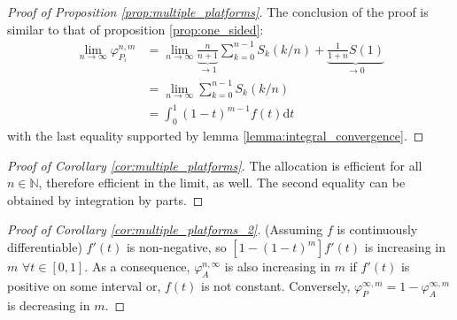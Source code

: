 \documentclass[a4paper]{article}
\newcommand{\dt}{\mathrm{d}t}
\begin{document}
\begin{proof}[Proof of Proposition \ref{prop:multiple_platforms}]
    The conclusion of the proof is similar to that of proposition \ref{prop:one_sided}:
    \begin{align*}
        \lim_{n \to \infty} \varphi_{P_i}^{n, m} &= \lim_{n \to \infty} \underbrace{\frac{n}{n+1}}_{\to 1} \sum_{k=0}^{n-1} S_k(k/n) + \underbrace{\frac{1}{1+n}S(1)}_{\to 0} \\
        &= \lim_{n \to \infty} \sum_{k=0}^{n-1} S_k(k/n) \\
        &= \int_0^1 (1-t)^{m-1} f(t) \dt
    \end{align*}
    with the last equality supported by lemma \ref{lemma:integral_convergence}.
\end{proof}

\begin{proof}[Proof of Corollary \ref{cor:multiple_platforms}]
    The allocation is efficient for all $n \in \mathbb{N}$, therefore efficient in the limit, as well.
    The second equality can be obtained by integration by parts.
\end{proof}

\begin{proof}[Proof of Corollary \ref{cor:multiple_platforms_2}] (Assuming $f$ is continuously differentiable) %
    $f'(t)$ is non-negative, so $[1 - (1-t)^m] f'(t)$ is increasing in $m$ $\forall t \in [0, 1]$.
    As a consequence, $\varphi_A^{n, \infty}$ is also increasing in $m$ if $f'(t)$ is positive on some interval or, $f(t)$ is not constant.
    Conversely, $\varphi_{P}^{\infty, m} = 1 - \varphi_{A}^{\infty, m}$ is decreasing in $m$.
\end{proof}
\end{document}

